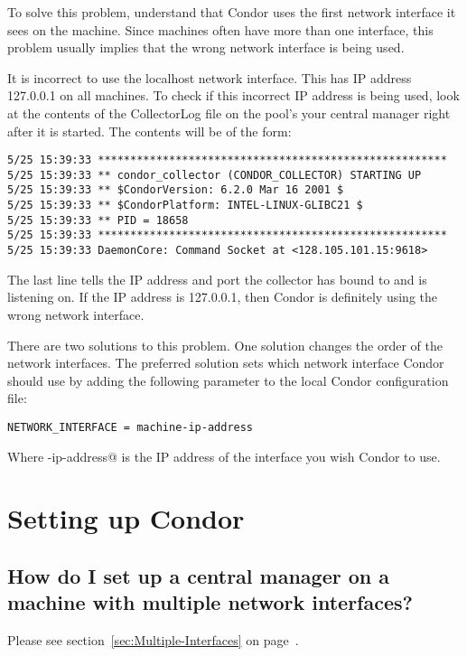 To solve this problem, understand that
Condor uses the first network interface it sees on the machine.
Since machines often have more than one interface,
this problem usually implies that the wrong network
interface is being used.

It is incorrect to use the localhost network interface.
This has IP address 127.0.0.1 on all machines.
To check if this incorrect IP address is being used,
look at the contents of the
CollectorLog file on the pool's
your central manager right after it is started.  
The contents will be of the form:

\begin{verbatim}
5/25 15:39:33 ******************************************************
5/25 15:39:33 ** condor_collector (CONDOR_COLLECTOR) STARTING UP
5/25 15:39:33 ** $CondorVersion: 6.2.0 Mar 16 2001 $
5/25 15:39:33 ** $CondorPlatform: INTEL-LINUX-GLIBC21 $
5/25 15:39:33 ** PID = 18658
5/25 15:39:33 ******************************************************
5/25 15:39:33 DaemonCore: Command Socket at <128.105.101.15:9618>
\end{verbatim}

The last line tells the IP address and port the collector has
bound to and is listening on.
If the IP address is 127.0.0.1, then Condor is definitely using the wrong
network interface.

There are two solutions to this problem.
One solution changes the order of the network interfaces.
The preferred solution
sets which network interface Condor should use
by adding the following parameter to the
local Condor configuration file:

\begin{verbatim}NETWORK_INTERFACE = machine-ip-address\end{verbatim}

Where \verb@machine-ip-address@ is the IP address of the interface you wish
Condor to use.

\section{Setting up Condor}

\subsection{How do I set up a central manager on a machine with multiple
network interfaces?}

Please see section~\ref{sec:Multiple-Interfaces} on 
page~\pageref{sec:Multiple-Interfaces}.

